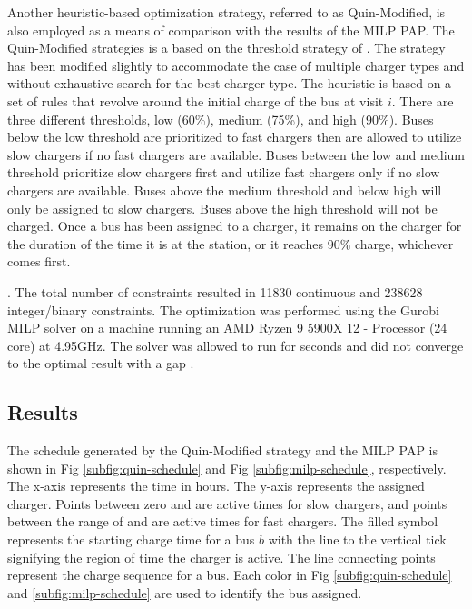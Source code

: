Another heuristic-based optimization strategy, referred to as Quin-Modified, is also employed as a means of comparison
with the results of the MILP PAP. The Quin-Modified strategies is a based on the threshold strategy of \cite{Qin2016}.
The strategy has been modified slightly to accommodate the case of multiple charger types and without exhaustive search
for the best charger type. The heuristic is based on a set of rules that revolve around the initial charge of the bus at
visit $i$. There are three different thresholds, low (60\%), medium (75\%), and high (90\%). Buses below the low
threshold are prioritized to fast chargers then are allowed to utilize slow chargers if no fast chargers are available.
Buses between the low and medium threshold prioritize slow chargers first and utilize fast chargers only if no slow
chargers are available. Buses above the medium threshold and below high will only be assigned to slow chargers. Buses
above the high threshold will not be charged. Once a bus has been assigned to a charger, it remains on the charger for
the duration of the time it is at the station, or it reaches 90\% charge, whichever comes first.

. The total number of constraints resulted in 11830 continuous and 238628 integer/binary constraints. The
optimization was performed using the Gurobi MILP solver \cite{GurobiOptimization2021} on a machine running an AMD Ryzen
9 5900X 12 - Processor (24 core) at 4.95GHz. The solver was allowed to run for \timeran seconds and did not converge to
the optimal result with a gap \gappercent.

%
\subsection{Results}

The schedule generated by the Quin-Modified strategy and the MILP PAP is shown in Fig \ref{subfig:quin-schedule} and Fig
\ref{subfig:milp-schedule}, respectively. The x-axis represents the time in hours. The y-axis represents the assigned
charger. Points between zero and  are active times for slow chargers, and points between the range of
 and  are active times for fast chargers. The filled symbol represents the
starting charge time for a bus $b$ with the line to the vertical tick signifying the region of time the charger is
active. The line connecting points represent the charge sequence for a bus. Each color in Fig \ref{subfig:quin-schedule}
and \ref{subfig:milp-schedule} are used to identify the bus assigned.

